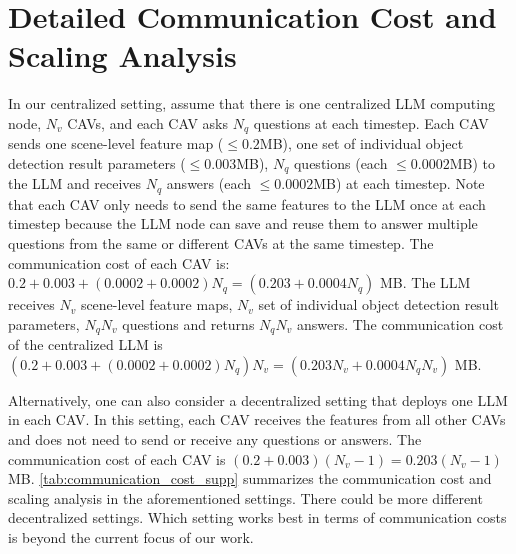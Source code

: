 \section{Detailed Communication Cost and Scaling Analysis}
In our centralized setting, assume that there is one centralized LLM computing node, $N_v$ CAVs, and each CAV asks $N_q$ questions at each timestep. Each CAV sends one scene-level feature map ($\leq 0.2$MB), one set of individual object detection result parameters ($\leq 0.003$MB), $N_q$ questions (each $\leq 0.0002$MB) to the LLM and receives $N_q$ answers (each $\leq 0.0002$MB) at each timestep.
Note that each CAV only needs to send the same features to the LLM  once at each timestep because the LLM node can save and reuse them to answer multiple questions from the same or different CAVs at the same timestep. The communication cost of each CAV is: $0.2 + 0.003 + (0.0002 + 0.0002)N_q = (0.203 + 0.0004N_q)$ MB. The LLM receives $N_v$ scene-level feature maps, $N_v$ set of individual object detection result parameters, $N_qN_v$ questions and returns $N_qN_v$ answers. The communication cost of the centralized LLM is $(0.2 + 0.003 + (0.0002 + 0.0002)N_q) N_v = (0.203N_v + 0.0004N_qN_v)$ MB. 



Alternatively, one can also consider a decentralized setting that deploys one LLM in each CAV. In this setting, each CAV receives the features from all other CAVs and does not need to send or receive any questions or answers. The communication cost of each CAV is $(0.2 + 0.003) (N_v - 1) = 0.203(N_v - 1)$ MB. \cref{tab:communication_cost_supp} summarizes the communication cost and scaling analysis in the aforementioned settings. There could be more different decentralized settings. Which setting works best in terms of communication costs is beyond the current focus of our work.

